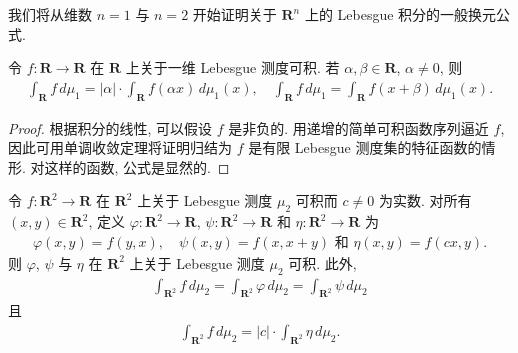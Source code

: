 \documentclass[../../main.tex]{subfiles}
\begin{document}
我们将从维数 $n=1$ 与 $n=2$ 开始证明关于 $\mathbf{R}^{n}$ 上的 Lebesgue 积分的一般换元公式.

\begin{proposition}\label{proposition:ch20-一维换元}
令 $f:\mathbf{R}\to\mathbf{R}$ 在 $\mathbf{R}$ 上关于一维 Lebesgue 测度可积. 若 $\alpha,\beta\in\mathbf{R}$, $\alpha\neq 0$, 则
\begin{align}\label{align:ch20-一维换元公式}
\int_{\mathbf{R}}f\,d\mu_{1}=|\alpha|\cdot\int_{\mathbf{R}}f(\alpha x)\,d\mu_{1}(x),\quad\int_{\mathbf{R}}f\,d\mu_{1}=\int_{\mathbf{R}}f(x+\beta)\,d\mu_{1}(x).
\end{align}
\end{proposition}

\begin{proof}
根据积分的线性, 可以假设 $f$ 是非负的. 用递增的简单可积函数序列逼近 $f$, 因此可用单调收敛定理将证明归结为 $f$ 是有限 Lebesgue 测度集的特征函数的情形. 对这样的函数, 公式是显然的.
\end{proof}

\begin{proposition}\label{proposition:ch20-二维换元}
令 $f:\mathbf{R}^{2}\to\mathbf{R}$ 在 $\mathbf{R}^{2}$ 上关于 Lebesgue 测度 $\mu_{2}$ 可积而 $c\neq 0$ 为实数. 对所有 $(x,y)\in\mathbf{R}^{2}$, 定义 $\varphi:\mathbf{R}^{2}\to\mathbf{R}$, $\psi:\mathbf{R}^{2}\to\mathbf{R}$ 和 $\eta:\mathbf{R}^{2}\to\mathbf{R}$ 为
\begin{align*}
\varphi(x,y)=f(y,x),\quad\psi(x,y)=f(x,x+y)\text{ 和 }\eta(x,y)=f(cx,y).
\end{align*}
则 $\varphi$, $\psi$ 与 $\eta$ 在 $\mathbf{R}^{2}$ 上关于 Lebesgue 测度 $\mu_{2}$ 可积. 此外,
\begin{align*}
\int_{\mathbf{R}^{2}}f\,d\mu_{2}=\int_{\mathbf{R}^{2}}\varphi\,d\mu_{2}=\int_{\mathbf{R}^{2}}\psi\,d\mu_{2}
\end{align*}
且
\begin{align*}
\int_{\mathbf{R}^{2}}f\,d\mu_{2}=|c|\cdot\int_{\mathbf{R}^{2}}\eta\,d\mu_{2}.
\end{align*}
\end{proposition}
\end{document}
